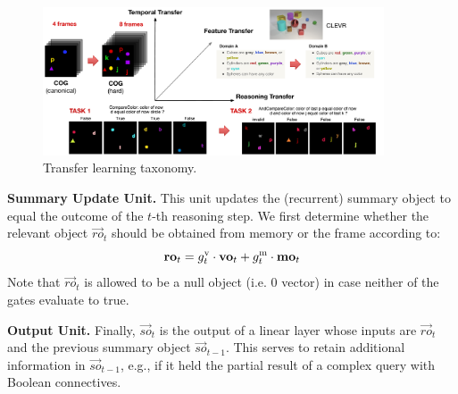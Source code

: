 \begin{figure}[htbp]
	\centering
	\includegraphics[width=0.9\textwidth]{../img/architecture/transfer_taxo}
	\caption{Transfer learning taxonomy.}
	\label{fig:taskonomy}\vspace{-10pt}
\end{figure}


\noindent\textbf{Summary Update Unit.}
This unit updates the (recurrent) summary object to equal the outcome of the $t$-th reasoning step.
We first determine whether the relevant object $\vec{ro}_t$ should be obtained from memory or the frame according to:
\[ \mathbf{ro}_t = g^{\mathrm{v}}_t \cdot \mathbf{vo}_t + g^{\mathrm{m}}_t \cdot \mathbf{mo}_t \]
Note that $\vec{ro}_t$ is allowed to be a null object (i.e. 0 vector) in case neither of the gates evaluate to true.

\smallskip

\noindent\textbf{Output Unit.} Finally, $\vec{so}_t$ is the output of a linear layer whose inputs are $\vec{ro}_t$ and the previous summary object $\vec{so}_{t-1}$.
This serves to retain additional information in $\vec{so}_{t-1}$, e.g., if it held the partial result of a complex query with Boolean connectives.
